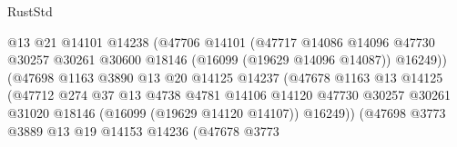 \begin{lexlean}{RustStd}
\begin{coremodule}
                                        @13
                                        @21
                                        @14101
                                        @14238
                                        (@47706
                                          @14101
                                          (@47717
                                            @14086
                                            @14096
                                            @47730
                                            @30257
                                            @30261
                                            @30600
                                            @18146
                                            (@16099 (@19629 @14096 @14087))
                                            @16249))
                                        (@47698
                                          @1163
                                          @3890
                                          @13
                                          @20
                                          @14125
                                          @14237
                                          (@47678
                                            @1163
                                            @13
                                            @14125
                                            (@47712
                                              @274
                                              @37
                                              @13
                                              @4738
                                              @4781
                                              @14106
                                              @14120
                                              @47730
                                              @30257
                                              @30261
                                              @31020
                                              @18146
                                              (@16099 (@19629 @14120 @14107))
                                              @16249))
                                          (@47698
                                            @3773
                                            @3889
                                            @13
                                            @19
                                            @14153
                                            @14236
                                            (@47678
                                              @3773

\end{coremodule}
\end{lexlean}

